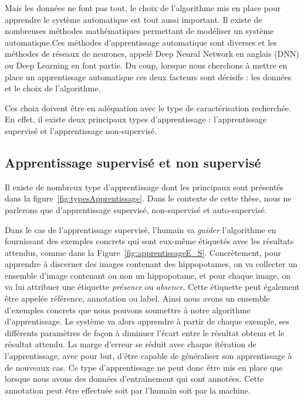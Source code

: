 Mais les données ne font pas tout, le choix de l'algorithme mis en place pour apprendre le système automatique est tout aussi important. Il existe de nombreuses méthodes mathématiques permettant de modéliser un système automatique.Ces méthodes d'apprentissage automatique sont diverses et les méthodes de réseaux de neurones, appelé Deep Neural Network en anglais (DNN) ou Deep Learning en font partie.
Du coup, lorsque nous cherchons à mettre en place un apprentissage automatique ces deux facteurs sont décisifs : les données et le choix de l'algorithme.

Ces choix doivent être en adéquation avec le type de caractérisation recherchée. En effet, il existe deux principaux types d'apprentissage : l'apprentissage supervisé et l'apprentissage non-supervisé.

\subsection{Apprentissage supervisé et non supervisé}

Il existe de nombreux type d'apprentissage dont les principaux sont présentés dans la figure~\ref{fig:typesApprentissage}. Dans le contexte de cette thèse, nous ne parlerons que d'apprentissage supervisé, non-supervisé et auto-supervisé.

Dans le cas de l'apprentissage supervisé, l'humain va \textit{guider} l’algorithme en fournissant des exemples concrets qui sont eux-même étiquetés avec les résultats attendus, comme dans la Figure~\ref{fig:apprentissageE_S}. Concrètement, pour apprendre à discerner des images contenant des hippopotames, on va collecter un ensemble d'image contenant ou non un hippopotame, et pour chaque image, on va lui attribuer une étiquette \textit{présence} ou \textit{absence}. Cette étiquette peut également être appelée référence, annotation ou label. Ainsi nous avons un ensemble d'exemples concrets que nous pouvons soumettre à notre algorithme d'apprentissage.
Le système va alors apprendre à partir de chaque exemple, ses différents paramètres de façon à diminuer l’écart entre le résultat obtenu et le résultat attendu. La marge d’erreur se réduit avec chaque itération de l'apprentissage, avec pour but, d’être capable de généraliser son apprentissage à de nouveaux cas. Ce type d'apprentissage ne peut donc être mis en place que lorsque nous avons des données d’entraînement qui sont annotées. Cette annotation peut être effectuée soit par l'humain soit par la machine.



